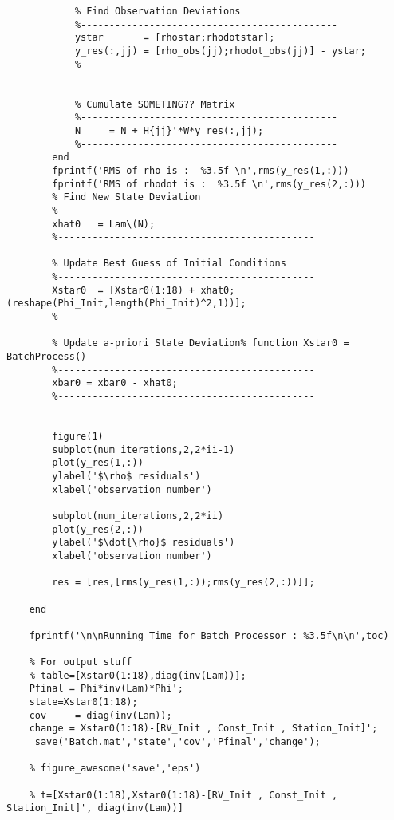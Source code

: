 \documentclass[12pt,a4paper,oneside]{article}
\numberwithin{equation}{section}   		%
\begin{document}
\begin{appendices}
\begin{lstlisting}
	        % Find Observation Deviations
	        %---------------------------------------------
	        ystar       = [rhostar;rhodotstar];
	        y_res(:,jj) = [rho_obs(jj);rhodot_obs(jj)] - ystar;
	        %---------------------------------------------
	
	        
	        % Cumulate SOMETING?? Matrix
	        %---------------------------------------------
	        N     = N + H{jj}'*W*y_res(:,jj);
	        %---------------------------------------------                                                         
	    end
	    fprintf('RMS of rho is :  %3.5f \n',rms(y_res(1,:)))
	    fprintf('RMS of rhodot is :  %3.5f \n',rms(y_res(2,:)))
	    % Find New State Deviation
	    %---------------------------------------------
	    xhat0   = Lam\(N);
	    %---------------------------------------------
	    
	    % Update Best Guess of Initial Conditions
	    %---------------------------------------------
	    Xstar0  = [Xstar0(1:18) + xhat0; (reshape(Phi_Init,length(Phi_Init)^2,1))];
	    %--------------------------------------------- 
	    
	    % Update a-priori State Deviation% function Xstar0 = BatchProcess()
	    %---------------------------------------------
	    xbar0 = xbar0 - xhat0;
	    %---------------------------------------------
	    
	    
	    figure(1)
	    subplot(num_iterations,2,2*ii-1)
	    plot(y_res(1,:))
	    ylabel('$\rho$ residuals')
	    xlabel('observation number')
	    
	    subplot(num_iterations,2,2*ii)
	    plot(y_res(2,:))
	    ylabel('$\dot{\rho}$ residuals')
	    xlabel('observation number')
	    
	    res = [res,[rms(y_res(1,:));rms(y_res(2,:))]];
	    
	end
	
	fprintf('\n\nRunning Time for Batch Processor : %3.5f\n\n',toc)
	
	% For output stuff
	% table=[Xstar0(1:18),diag(inv(Lam))];
	Pfinal = Phi*inv(Lam)*Phi';
	state=Xstar0(1:18);
	cov     = diag(inv(Lam));
	change = Xstar0(1:18)-[RV_Init , Const_Init , Station_Init]';
	 save('Batch.mat','state','cov','Pfinal','change');
	
	% figure_awesome('save','eps')
	
	% t=[Xstar0(1:18),Xstar0(1:18)-[RV_Init , Const_Init , Station_Init]', diag(inv(Lam))]
\end{lstlisting}




\end{appendices}
\end{document}
